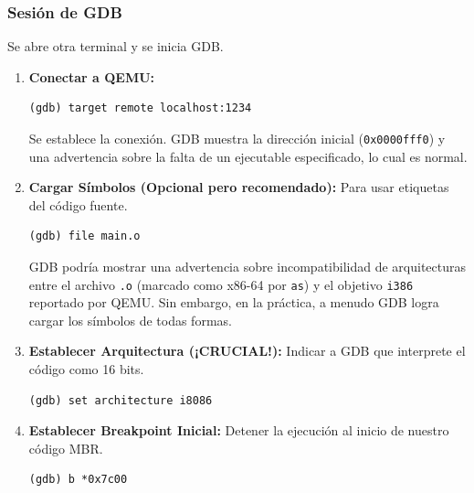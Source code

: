 \subsubsection{Sesión de GDB}

Se abre otra terminal y se inicia GDB.

\begin{enumerate}[noitemsep]
    \item \textbf{Conectar a QEMU:}
        \begin{lstlisting}[style=GdbStyle]
(gdb) target remote localhost:1234 
        \end{lstlisting}
        Se establece la conexión. GDB muestra la dirección inicial (\texttt{0x0000fff0}) y una advertencia sobre la falta de un ejecutable especificado, lo cual es normal.
    
    \item \textbf{Cargar Símbolos (Opcional pero recomendado):} Para usar etiquetas del código fuente.
        \begin{lstlisting}[style=GdbStyle]
(gdb) file main.o
        \end{lstlisting}
        GDB podría mostrar una advertencia sobre incompatibilidad de arquitecturas entre el archivo \texttt{.o} (marcado como x86-64 por \texttt{as}) y el objetivo \texttt{i386} reportado por QEMU. Sin embargo, en la práctica, a menudo GDB logra cargar los símbolos de todas formas.


    \item \textbf{Establecer Arquitectura (¡CRUCIAL!):} Indicar a GDB que interprete el código como 16 bits.
        \begin{lstlisting}[style=GdbStyle]
(gdb) set architecture i8086
        \end{lstlisting}
        
    \item \textbf{Establecer Breakpoint Inicial:} Detener la ejecución al inicio de nuestro código MBR.
        \begin{lstlisting}[style=GdbStyle]
(gdb) b *0x7c00
        \end{lstlisting}
        

\end{enumerate}
